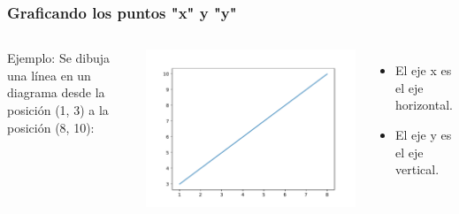 \begin{frame}[fragile]
  \frametitle{Graficando los puntos "x" y "y"}

  \begin{columns}
        \begin{exampleblock}{Ejemplo:}
          Se dibuja una línea en un diagrama desde la posición
          (1, 3) a la posición (8, 10):
          
        \end{exampleblock}
      \pausa
      \begin{center}
          \includegraphics[scale=0.4]{ejemplos/e02.pdf}
      \end{center}
      \begin{itemize}
        \item El eje x es el eje horizontal.
        \item El eje y es el eje vertical.
      \end{itemize}
  \end{columns}
\end{frame}

